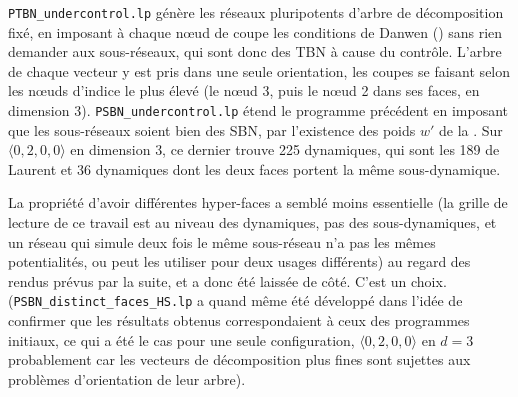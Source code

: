 \documentclass[12pt, a4paper]{article}
\begin{document}
\texttt{PTBN\_undercontrol.lp} génère les réseaux pluripotents d'arbre de décomposition fixé, en imposant à chaque nœud de coupe les conditions de Danwen () sans rien demander aux sous-réseaux, qui sont donc des TBN à cause du contrôle.
L'arbre de chaque vecteur y est pris dans une seule orientation, les coupes se faisant selon les nœuds d'indice le plus élevé (le nœud 3, puis le nœud 2 dans ses faces, en dimension 3).
\texttt{PSBN\_undercontrol.lp} étend le programme précédent en imposant que les sous-réseaux soient bien des SBN, par l'existence des poids $w'$ de la .
Sur $\langle 0,2,0,0\rangle$ en dimension 3, ce dernier trouve 225 dynamiques, qui sont les 189 de Laurent et 36 dynamiques dont les deux faces portent la même sous-dynamique.

La propriété d'avoir différentes hyper-faces a semblé moins essentielle (la grille de lecture de ce travail est au niveau des dynamiques, pas des sous-dynamiques, et un réseau qui simule deux fois le même sous-réseau n'a pas les mêmes potentialités, ou peut les utiliser pour deux usages différents) au regard des rendus prévus par la suite, et a donc été laissée de côté. C'est un choix. (\texttt{PSBN\_distinct\_faces\_HS.lp} a quand même été développé dans l'idée de confirmer que les résultats obtenus correspondaient à ceux des programmes initiaux, ce qui a été le cas pour une seule configuration, $\langle 0,2,0,0\rangle$ en $d=3$ probablement car les vecteurs de décomposition plus fines sont sujettes aux problèmes d'orientation de leur arbre).
\end{document}
